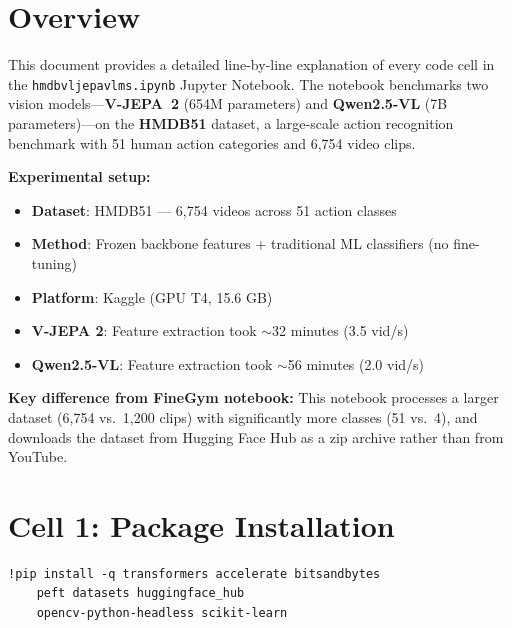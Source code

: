 

\section{Overview}

This document provides a detailed line-by-line explanation of every code cell in the \texttt{hmdbvljepavlms.ipynb} Jupyter Notebook. The notebook benchmarks two vision models---\textbf{V-JEPA~2} (654M parameters) and \textbf{Qwen2.5-VL} (7B parameters)---on the \textbf{HMDB51} dataset, a large-scale action recognition benchmark with 51 human action categories and 6,754 video clips.

\textbf{Experimental setup:}
\begin{itemize}[nosep]
  \item \textbf{Dataset}: HMDB51 --- 6,754 videos across 51 action classes
  \item \textbf{Method}: Frozen backbone features + traditional ML classifiers (no fine-tuning)
  \item \textbf{Platform}: Kaggle (GPU T4, 15.6 GB)
  \item \textbf{V-JEPA 2}: Feature extraction took $\sim$32 minutes (3.5 vid/s)
  \item \textbf{Qwen2.5-VL}: Feature extraction took $\sim$56 minutes (2.0 vid/s)
\end{itemize}

\textbf{Key difference from FineGym notebook:} This notebook processes a larger dataset (6,754 vs.\ 1,200 clips) with significantly more classes (51 vs.\ 4), and downloads the dataset from Hugging Face Hub as a zip archive rather than from YouTube.

\newpage
\section{Cell 1: Package Installation}

\begin{lstlisting}
!pip install -q transformers accelerate bitsandbytes
    peft datasets huggingface_hub
    opencv-python-headless scikit-learn
\end{lstlisting}

